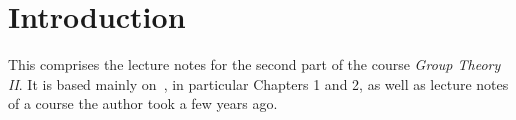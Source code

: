 \chapter*{Introduction}

This comprises the lecture notes for the second part of the course \emph{Group Theory II}.
It is based mainly on~\cite{Sagan}, in particular Chapters 1 and 2, as well as lecture notes of a course the author took a few years ago.